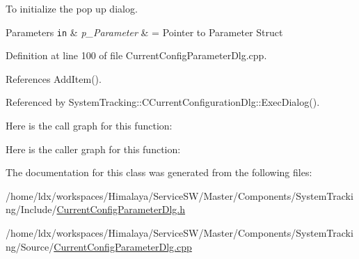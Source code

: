 \-To initialize the pop up dialog. 


\begin{DoxyParams}[1]{\-Parameters}
\mbox{\tt in}  & {\em p\-\_\-\-Parameter} & = \-Pointer to \-Parameter \-Struct \\
\hline
\end{DoxyParams}


\-Definition at line 100 of file \-Current\-Config\-Parameter\-Dlg.\-cpp.



\-References \-Add\-Item().



\-Referenced by \-System\-Tracking\-::\-C\-Current\-Configuration\-Dlg\-::\-Exec\-Dialog().



\-Here is the call graph for this function\-:




\-Here is the caller graph for this function\-:




\-The documentation for this class was generated from the following files\-:\begin{DoxyCompactItemize}
\item 
/home/ldx/workspaces/\-Himalaya/\-Service\-S\-W/\-Master/\-Components/\-System\-Tracking/\-Include/\hyperlink{CurrentConfigParameterDlg_8h}{\-Current\-Config\-Parameter\-Dlg.\-h}\item 
/home/ldx/workspaces/\-Himalaya/\-Service\-S\-W/\-Master/\-Components/\-System\-Tracking/\-Source/\hyperlink{CurrentConfigParameterDlg_8cpp}{\-Current\-Config\-Parameter\-Dlg.\-cpp}\end{DoxyCompactItemize}
